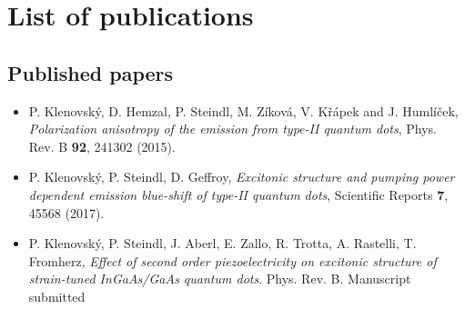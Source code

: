 \documentclass[
a4paper, %
11pt, %
onecolumn, %
openany, %
oldfontcommands,
]{memoir}
\begin{document}
%
\chapter{List of publications}\label{chap:publications}

\section*{Published papers}
\begin{itemize}
	\item P. Klenovský, D. Hemzal, P. Steindl, M. Zíková, V. Křápek and J. Humlíček, \textit{Polarization anisotropy of the emission from type-II quantum dots}, Phys. Rev. B \textbf{92}, 241302 (2015).
	
	\item P. Klenovský, P. Steindl, D. Geffroy, \textit{Excitonic structure and pumping power dependent emission blue-shift of type-II quantum dots}, Scientific Reports \textbf{7}, 45568 (2017).
	
	\item P. Klenovský, P. Steindl, J. Aberl, E. Zallo, R. Trotta, A. Rastelli, T. Fromherz, \textit{Effect of second order piezoelectricity on excitonic structure of strain-tuned InGaAs/GaAs quantum dots}. Phys. Rev. B. Manuscript submitted
\end{itemize}
\end{document}
